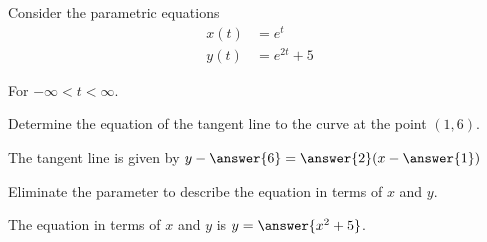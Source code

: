 \documentclass{ximera}
\author{Jason Miller}
\begin{document}
\begin{exercise}
Consider the parametric equations 
\begin{align*}
x(t) &= e^t\\
y(t) &= e^{2t}+5
\end{align*}

For $-\infty < t < \infty$.

Determine the equation of the tangent line to the curve at the point $(1,6)$. 

The tangent line is given by $y-\answer{6}=\answer{ 2 }(x-\answer{1})$

\begin{exercise}

Eliminate the parameter to describe the equation in terms of $x$ and $y$. 

The equation in terms of $x$ and $y$ is $y= \answer{x^2+5}$.


\end{exercise}
\end{exercise}
\end{document}
